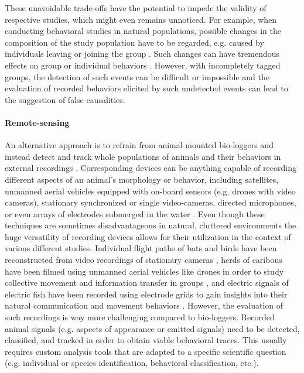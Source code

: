 These unavoidable trade-offs have the potential to impede the validity of respective studies, which might even remains unnoticed. For example, when conducting behavioral studies in natural populations, possible changes in the composition of the study population have to be regarded, e.g. caused by individuals leaving or joining the group \citep{Janson1985, Engh2002}. Such changes can have tremendous effects on group or individual behaviors \citep{Metcalfe1995, Sapolsky2005}. However, with incompletely tagged groups, the detection of such events can be difficult or impossible and the evaluation of recorded behaviors elicited by such undetected events can lead to the suggestion of false causalities.

\paragraph{Remote-sensing} 
An alternative approach is to refrain from animal mounted bio-loggers and instead detect and track whole populations of animals and their behaviors in external recordings \citep{Hughey2018}. Corresponding devices can be anything capable of recording different aspects of an animal's morphology or behavior, including satellites, unmanned aerial vehicles equipped with on-board sensors (e.g. drones with video cameras), stationary synchronized or single video-cameras, directed microphones, or even arrays of electrodes submerged in the water \citep{Theriault2014, Henninger2018, Hughey2018}. Even though these techniques are sometimes disadvantageous in natural, cluttered environments \citep{Dell2014} the huge versatility of recording devices allows for their utilization in the context of various different studies. Individual flight paths of bats and birds have been reconstructed from video recordings of stationary cameras \citep{Theriault2014}, herds of caribous have been filmed using unmanned aerial vehicles like drones in order to study collective movement and information transfer in groups \citep{Torney2018}, and electric signals of electric fish have been recorded using electrode grids to gain insights into their natural communication and movement behaviors \citep{Henninger2018, Henninger2020}. However, the evaluation of such recordings is way more challenging compared to bio-loggers. Recorded animal signals (e.g. aspects of appearance or emitted signals) need to be detected, classified, and tracked in order to obtain viable behavioral traces. This usually requires custom analysis tools that are adapted to a specific scientific question (e.g. individual or species identification, behavioral classification, etc.).

